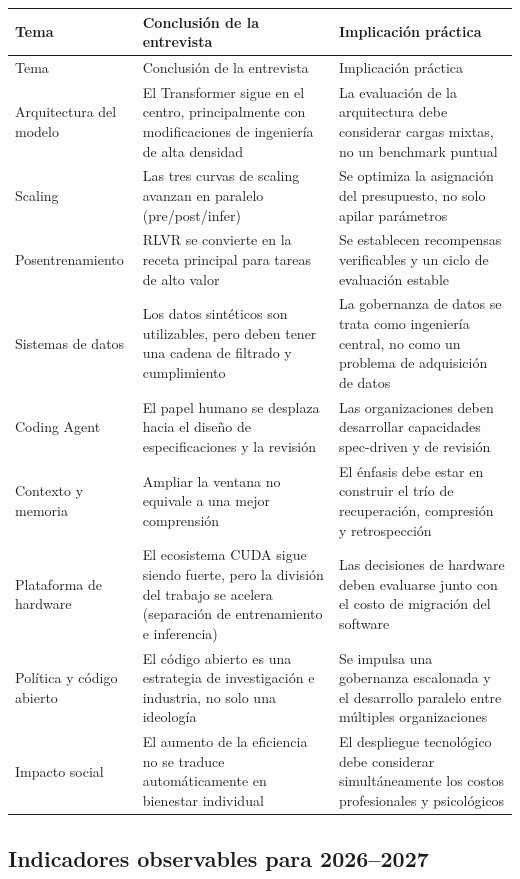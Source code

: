 \documentclass[a4paper]{article}
\begin{document}
\begin{longtable}{p{}p{}p{}}
\toprule
Tema & Conclusión de la entrevista & Implicación práctica \\
\midrule
\endfirsthead
\toprule
Tema & Conclusión de la entrevista & Implicación práctica \\
\midrule
\endhead
Arquitectura del modelo & El Transformer sigue en el centro, principalmente con modificaciones de ingeniería de alta densidad & La evaluación de la arquitectura debe considerar cargas mixtas, no un benchmark puntual \\
Scaling & Las tres curvas de scaling avanzan en paralelo (pre/post/infer) & Se optimiza la asignación del presupuesto, no solo apilar parámetros \\
Posentrenamiento & RLVR se convierte en la receta principal para tareas de alto valor & Se establecen recompensas verificables y un ciclo de evaluación estable \\
Sistemas de datos & Los datos sintéticos son utilizables, pero deben tener una cadena de filtrado y cumplimiento & La gobernanza de datos se trata como ingeniería central, no como un problema de adquisición de datos \\
Coding Agent & El papel humano se desplaza hacia el diseño de especificaciones y la revisión & Las organizaciones deben desarrollar capacidades spec-driven y de revisión \\
Contexto y memoria & Ampliar la ventana no equivale a una mejor comprensión & El énfasis debe estar en construir el trío de recuperación, compresión y retrospección \\
Plataforma de hardware & El ecosistema CUDA sigue siendo fuerte, pero la división del trabajo se acelera (separación de entrenamiento e inferencia) & Las decisiones de hardware deben evaluarse junto con el costo de migración del software \\
Política y código abierto & El código abierto es una estrategia de investigación e industria, no solo una ideología & Se impulsa una gobernanza escalonada y el desarrollo paralelo entre múltiples organizaciones \\
Impacto social & El aumento de la eficiencia no se traduce automáticamente en bienestar individual & El despliegue tecnológico debe considerar simultáneamente los costos profesionales y psicológicos \\
\bottomrule
\end{longtable}

\subsection{Indicadores observables para 2026--2027}
\end{document}
